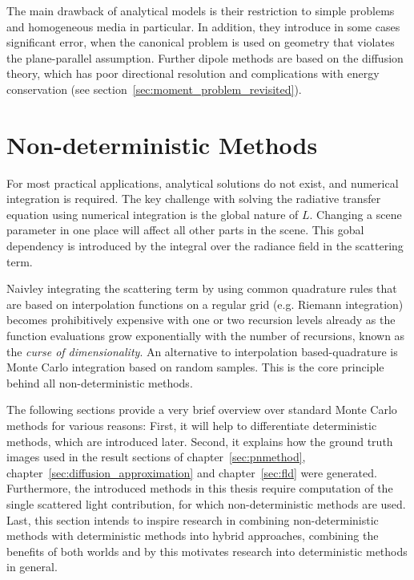 The main drawback of analytical models is their restriction to simple problems and homogeneous media in particular. In addition, they introduce in some cases significant error, when the canonical problem is used on geometry that violates the plane-parallel assumption. Further dipole methods are based on the diffusion theory, which has poor directional resolution and complications with energy conservation (see section~\ref{sec:moment_problem_revisited}).

\section{Non-deterministic Methods}
\label{sec:foundations_mc}

For most practical applications, analytical solutions do not exist, and numerical integration is required. The key challenge with solving the radiative transfer equation using numerical integration is the global nature of $L$. Changing a scene parameter in one place will affect all other parts in the scene. This gobal dependency is introduced by the integral over the radiance field in the scattering term. 

Naivley integrating the scattering term by using common quadrature rules that are based on interpolation functions on a regular grid (e.g. Riemann integration) becomes prohibitively expensive with one or two recursion levels already as the function evaluations grow exponentially with the number of recursions, known as the \emph{curse of dimensionality}. An alternative to interpolation based-quadrature is Monte Carlo integration based on random samples. This is the core principle behind all non-deterministic methods.

The following sections provide a very brief overview over standard Monte Carlo methods for various reasons: First, it will help to differentiate deterministic methods, which are introduced later. Second, it explains how the ground truth images used in the result sections of chapter~\ref{sec:pnmethod}, chapter~\ref{sec:diffusion_approximation} and chapter~\ref{sec:fld} were generated. Furthermore, the introduced methods in this thesis require computation of the single scattered light contribution, for which non-deterministic methods are used. Last, this section intends to inspire research in combining non-deterministic methods with deterministic methods into hybrid approaches, combining the benefits of both worlds and by this motivates research into deterministic methods in general.

